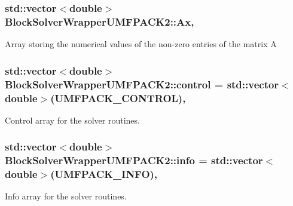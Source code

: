 \subsubsection[{\texorpdfstring{Ax}{Ax}}]{\setlength{\rightskip}{0pt plus 5cm}std\+::vector$<$double$>$ Block\+Solver\+Wrapper\+U\+M\+F\+P\+A\+C\+K2\+::\+Ax\hspace{0.3cm}{\ttfamily [mutable]}, {\ttfamily [private]}}\hypertarget{class_block_solver_wrapper_u_m_f_p_a_c_k2_a57a4f7722dbbdd1ec2efa416f1cbb47c}{}\label{class_block_solver_wrapper_u_m_f_p_a_c_k2_a57a4f7722dbbdd1ec2efa416f1cbb47c}
Array storing the numerical values of the non-\/zero entries of the matrix A 
\subsubsection[{\texorpdfstring{control}{control}}]{\setlength{\rightskip}{0pt plus 5cm}std\+::vector$<$double$>$ Block\+Solver\+Wrapper\+U\+M\+F\+P\+A\+C\+K2\+::control = std\+::vector$<$double$>$(U\+M\+F\+P\+A\+C\+K\+\_\+\+C\+O\+N\+T\+R\+OL)\hspace{0.3cm}{\ttfamily [mutable]}, {\ttfamily [private]}}\hypertarget{class_block_solver_wrapper_u_m_f_p_a_c_k2_a295fca0b28991ae43c7bdfb72b5cdcb2}{}\label{class_block_solver_wrapper_u_m_f_p_a_c_k2_a295fca0b28991ae43c7bdfb72b5cdcb2}
Control array for the solver routines. 
\subsubsection[{\texorpdfstring{info}{info}}]{\setlength{\rightskip}{0pt plus 5cm}std\+::vector$<$double$>$ Block\+Solver\+Wrapper\+U\+M\+F\+P\+A\+C\+K2\+::info = std\+::vector$<$double$>$(U\+M\+F\+P\+A\+C\+K\+\_\+\+I\+N\+FO)\hspace{0.3cm}{\ttfamily [mutable]}, {\ttfamily [private]}}\hypertarget{class_block_solver_wrapper_u_m_f_p_a_c_k2_a8dfbe8f5e1f1cf26460ba584b4eb02b6}{}\label{class_block_solver_wrapper_u_m_f_p_a_c_k2_a8dfbe8f5e1f1cf26460ba584b4eb02b6}
Info array for the solver routines. 
